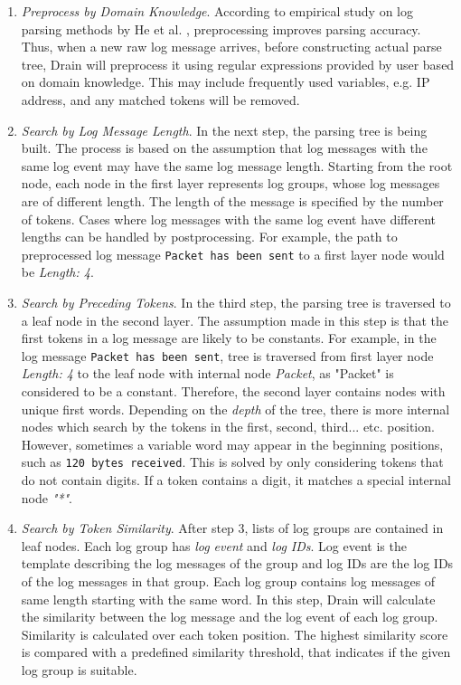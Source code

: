     \begin{enumerate}
        \item \textit{Preprocess by Domain Knowledge}. According to empirical study on log parsing methods by He et al. \cite{logParsingEvaluation2016}, preprocessing improves parsing accuracy. Thus, when a new raw log message arrives, before constructing actual parse tree, Drain will preprocess it using regular expressions provided by user based on domain knowledge. This may include frequently used variables, e.g. IP address, and any matched tokens will be removed. 
        \item \textit{Search by Log Message Length}. In the next step, the parsing tree is being built. The process is based on the assumption that log messages with the same log event may have the same log message length. Starting from the root node, each node in the first layer represents log groups, whose log messages are of different length. The length of the message is specified by the number of tokens. Cases where log messages with the same log event have different lengths can be handled by postprocessing. For example, the path to preprocessed log message \texttt{Packet has been sent} to a first layer node would be \textit{Length: 4}.
        
        \item \textit{Search by Preceding Tokens}. In the third step, the parsing tree is traversed to a leaf node in the second layer. The assumption made in this step is that the first tokens in a log message are likely to be constants. For example, in the log message \texttt{Packet has been sent}, tree is traversed from first layer node \textit{Length: 4} to the leaf node with internal node \textit{Packet}, as "Packet" is considered to be a constant. Therefore, the second layer contains nodes with unique first words. Depending on the \textit{depth} of the tree, there is more internal nodes which search by the tokens in the first, second, third... etc. position. However, sometimes a variable word may appear in the beginning positions, such as \texttt{120 bytes received}. This is solved by only considering tokens that do not contain digits. If a token contains a digit, it matches a special internal node \textit{"*"}. 
        
        \item \textit{Search by Token Similarity}. After step 3, lists of log groups are contained in leaf nodes. Each log group has \textit{log event} and
\textit{log IDs}. Log event is the template describing the log messages of the group and log IDs are the log IDs of the log messages in that group. Each log group contains log messages of same length starting with the same word. In this step, Drain will calculate the similarity between the log message and the log event of each log group. Similarity is calculated over each token position. The highest similarity score is compared with a predefined similarity threshold, that indicates if the given log group is suitable.
        

\end{enumerate}
